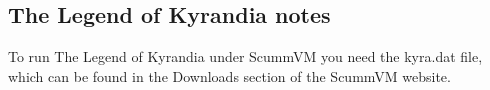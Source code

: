 \subsection{The Legend of Kyrandia notes}
To run The Legend of Kyrandia under ScummVM you need the kyra.dat file,
which can be found in the Downloads section of the ScummVM website.
